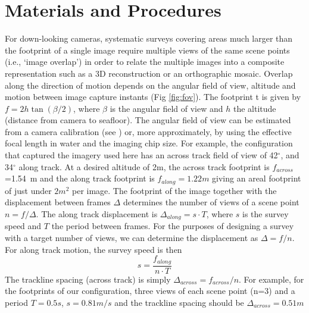 \section{Materials and Procedures}
\label{sec:MandP}


For down-looking cameras, systematic surveys covering areas much larger than the footprint of a single image require multiple views of the same scene points (i.e., `image overlap') in order to relate the multiple images into a composite representation such as a 3D reconstruction or an orthographic mosaic. Overlap along the direction of motion depends on the angular field of view, altitude and motion between image capture instants (Fig \ref{fig:fov}). The footprint t is given by $f = 2 h \tan(\beta/2)$, where $\beta$ is the angular field of view and $h$ the altitude (distance from camera to seafloor). The angular field of view can be estimated from a camera calibration (see \cite{}) or, more approximately, by using the effective focal length in water and the imaging chip size. For example, the configuration that captured the imagery used here has an across track field of view of 42$^\circ$, and 34$^\circ$ along track. At a desired altitude of 2m, the across track footprint is $f_{across}$=1.54~m and the along track footprint is $f_{along}=1.22m$ giving an areal footprint of just under $2m^2$ per image. 
The footprint of the image together with the displacement between frames $\Delta$ determines the number of views of a scene point $n = f /\Delta$. The along track displacement is $\Delta_{along} = s \cdot T$, where $s$ is the survey speed and $T$ the period between frames. 
For the purposes of designing a survey with a target number of views, we can determine the displacement as $\Delta = f/n$. For along track motion, the survey speed is then
\begin{equation}
s = \frac{f_{along}}{n \cdot T}
\end{equation}
The trackline spacing (across track) is simply $\Delta_{across} = f_{across}/n$.
For example, for the footprints of our configuration, three views of each scene point (n=3) and a period $T=0.5s$, $s=0.81m/s$ and the trackline spacing should be $\Delta_{across} = 0.51m$

